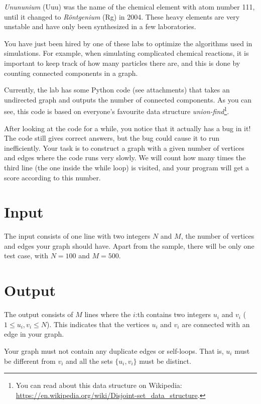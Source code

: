 

\emph{Unununium} (Uuu) was the name of the chemical element with atom number 111, until it changed to
\emph{Röntgenium} (Rg) in 2004. These heavy elements are very unstable and have only been synthesized
in a few laboratories.

You have just been hired by one of these labs to optimize the algorithms used in simulations.
For example, when simulating complicated chemical reactions, it is important to keep track of 
how many particles there are, and this is done by counting connected components in a graph.

Currently, the lab has some Python code (see attachments) that takes an undirected graph and 
outputs the number of connected components. As you can see, this code is based on everyone's
favourite data structure \emph{union-find}\footnote{
  You can read about this data structure on Wikipedia: \url{https://en.wikipedia.org/wiki/Disjoint-set\_data\_structure}.
}.

After looking at the code for a while, you notice that it actually has a bug in it!  The code still 
gives correct answers, but the bug could cause it to run inefficiently.
Your task is to construct a graph with a given number of vertices and edges where the code runs very slowly.
We will count how many times the third line (the one inside the while loop) is visited, and your program will get a score according to this number.

\section*{Input}
The input consists of one line with two integers $N$ and $M$, the number of vertices and edges
your graph should have. Apart from the sample, there will be only one test case, with $N = 100$
and $M = 500$.

\section*{Output}
The output consists of $M$ lines where the $i$:th contains two integers $u_i$ and $v_i$
($1 \leq u_i, v_i \leq N$). This indicates that the vertices $u_i$ and $v_i$ are connected
with an edge in your graph.

Your graph must not contain any duplicate edges or self-loops. That is, $u_i$ must be different
from $v_i$ and all the sets $\{u_i, v_i\}$ must be distinct.


